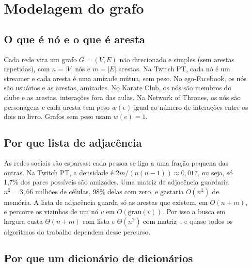 \section{Modelagem do grafo}\label{sec:modelagem}

\subsection{O que é nó e o que é aresta}

Cada rede vira um grafo $G = (V, E)$ não direcionado e simples (sem arestas repetidas),
com $n = |V|$ nós e $m = |E|$ arestas. Na Twitch PT, cada nó é um streamer e cada aresta é
uma amizade mútua, sem peso. No ego-Facebook, os nós são usuários e as arestas, amizades.
No Karate Club, os nós são membros do clube e as arestas, interações fora das aulas. Na
Network of Thrones, os nós são personagens e cada aresta tem peso $w(e)$ igual ao número de
interações entre os dois no livro. Grafos sem peso usam $w(e) = 1$.

\subsection{Por que lista de adjacência}

As redes sociais são esparsas: cada pessoa se liga a uma fração pequena das outras. Na
Twitch PT, a densidade é $2m/(n(n-1)) \approx 0{,}017$, ou seja, só 1,7\% dos pares possíveis
são amizades. Uma matriz de adjacência guardaria $n^2 = 3{,}66$ milhões de células, 98\% delas
com zero, e gastaria $O(n^2)$ de memória. A lista de adjacência guarda só as arestas que
existem, em $O(n + m)$, e percorre os vizinhos de um nó $v$ em $O(\text{grau}(v))$. Por isso
a busca em largura custa $\Theta(n + m)$ com lista e $\Theta(n^2)$ com
matriz~\cite{cormen2022,sedgewick2011}, e quase todos os algoritmos do trabalho dependem
desse percurso.

\subsection{Por que um dicionário de dicionários}

